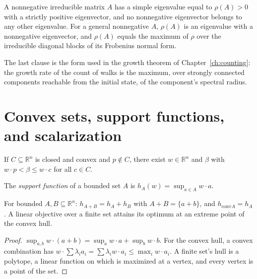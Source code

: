 \begin{established}\label{b:pf}
A nonnegative irreducible matrix $A$ has a simple eigenvalue equal to $\rho(A)>0$ with a strictly positive eigenvector, and no nonnegative eigenvector belongs to any other eigenvalue. For a general nonnegative $A$, $\rho(A)$ is an eigenvalue with a nonnegative eigenvector, and $\rho(A)$ equals the maximum of $\rho$ over the irreducible diagonal blocks of its Frobenius normal form.
\end{established}

The last clause is the form used in the growth theorem of Chapter~\ref{ch:counting}: the growth rate of the count of walks is the maximum, over strongly connected components reachable from the initial state, of the component's spectral radius.

\section{Convex sets, support functions, and scalarization}

\begin{established}\label{b:sep}
If $C\subseteq\mathbb R^n$ is closed and convex and $p\notin C$, there exist $w\in\mathbb R^n$ and $\beta$ with $w\cdot p<\beta\le w\cdot c$ for all $c\in C$.
\end{established}

The \emph{support function} of a bounded set $A$ is $h_A(w)=\sup_{a\in A}w\cdot a$.

\begin{newresult}\label{b:support}
For bounded $A,B\subseteq\mathbb R^n$: $h_{A+B}=h_A+h_B$ with $A+B=\{a+b\}$, and $h_{\mathrm{conv}A}=h_A$. A linear objective over a finite set attains its optimum at an extreme point of the convex hull.
\end{newresult}
\begin{proof}
$\sup_{a,b}w\cdot(a+b)=\sup_aw\cdot a+\sup_bw\cdot b$. For the convex hull, a convex combination has $w\cdot\sum\lambda_ia_i=\sum\lambda_iw\cdot a_i\le\max_iw\cdot a_i$. A finite set's hull is a polytope, a linear function on which is maximized at a vertex, and every vertex is a point of the set.
\end{proof}

